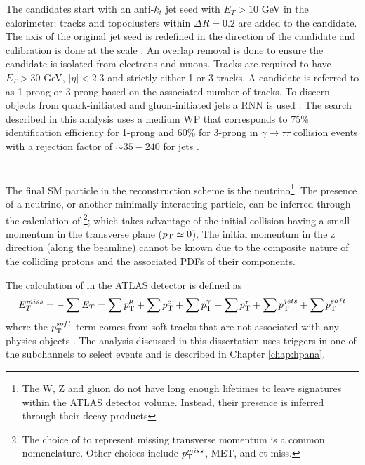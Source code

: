 		The \tauhad candidates start with an anti-$k_t$ jet seed with $E_T>10$ GeV in the calorimeter; tracks and topoclusters within $\Delta R = 0.2$ are added to the \tauhad candidate. The axis of the original jet seed is redefined in the direction of the \tauhad candidate and calibration is done at the \tauhad scale \cite{tau-id-calib}. An overlap removal is done to ensure the \tauhad candidate is isolated from electrons and muons. Tracks are required to have $E_{T}>30$ GeV, $|\eta|<2.3$ and strictly either 1 or 3 tracks. A \tauhad candidate is referred to as 1-prong or 3-prong based on the associated number of tracks. To discern \tauhad objects from quark-initiated and gluon-initiated jets a \gls{RNN} is used \cite{tau-id-rnn}. The search described in this analysis uses a medium \gls{WP} that corresponds to 75\% identification efficiency for 1-prong and 60\% for 3-prong in $\gamma \to \tau \tau$ collision events with a rejection factor of $\sim 35-240$ for jets \cite{tau-id-rnn}.
 
	\section{\Etm}\label{sec:reco-etmiss}
		The final \acrshort{SM} particle in the reconstruction scheme is the neutrino\footnote{The W, Z and gluon do not have long enough lifetimes to leave signatures within the \gls{ATLAS} detector volume. Instead, their presence is inferred through their decay products}. The presence of a neutrino, or another minimally interacting particle, can be inferred through the calculation of \Etm\footnote{The choice of \Etm to represent missing transverse momentum is a common nomenclature. Other choices include $p_{\text{T}}^{miss}$, MET, and et miss.}; which takes advantage of the initial collision having a small momentum in the transverse plane ($p_{\text{T}} \simeq 0$). The initial momentum in the z direction (along the beamline) cannot be known due to the composite nature of the colliding protons and the associated PDFs of their components.

		The calculation of \Etm in the \gls{ATLAS} detector is defined as
		\begin{equation}\label{eqn:etmiss}
		E_{T}^{miss} = - \sum E_{T} = \sum p_{\text{T}}^{\mu} + \sum p_{\text{T}}^{e} + \sum p_{\text{T}}^{\gamma} + \sum p_{\text{T}}^{\tau} + \sum p_{\text{T}}^{jets} + \sum p_{\text{T}}^{soft}
		\end{equation}
		where the $p_{\text{T}}^{soft}$ term comes from soft tracks that are not associated with any physics objects \cite{met-perf}. The analysis discussed in this dissertation uses \Etm triggers in one of the subchannels to select events and is described in Chapter \ref{chap:hpana}.